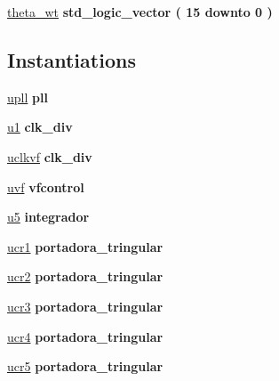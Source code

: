 \begin{DoxyCompactItemize}
\item 
\hyperlink{class_d_e0___n_a_n_o___v_f_1_1_m_a_i_n_a799a7bc2994ce9027cae6d5626148dc1}{theta\+\_\+wt} {\bfseries \textcolor{comment}{std\+\_\+logic\+\_\+vector}\textcolor{vhdlchar}{ }\textcolor{vhdlchar}{(}\textcolor{vhdlchar}{ }\textcolor{vhdlchar}{ } \textcolor{vhdldigit}{15} \textcolor{vhdlchar}{ }\textcolor{keywordflow}{downto}\textcolor{vhdlchar}{ }\textcolor{vhdlchar}{ } \textcolor{vhdldigit}{0} \textcolor{vhdlchar}{ }\textcolor{vhdlchar}{)}\textcolor{vhdlchar}{ }} 
\end{DoxyCompactItemize}
\subsection*{Instantiations}
 \begin{DoxyCompactItemize}
\item 
\hyperlink{class_d_e0___n_a_n_o___v_f_1_1_m_a_i_n_a2512a47a9296510af74d6b00755ca2bc}{upll}  {\bfseries pll}   
\item 
\hyperlink{class_d_e0___n_a_n_o___v_f_1_1_m_a_i_n_a8026a39c502750413402a90d9d8bae3c}{u1}  {\bfseries clk\+\_\+div}   
\item 
\hyperlink{class_d_e0___n_a_n_o___v_f_1_1_m_a_i_n_a27eb557254744669a6a00b4944ff5275}{uclkvf}  {\bfseries clk\+\_\+div}   
\item 
\hyperlink{class_d_e0___n_a_n_o___v_f_1_1_m_a_i_n_a05342d075a5ca740d21e6ef1a5509684}{uvf}  {\bfseries vfcontrol}   
\item 
\hyperlink{class_d_e0___n_a_n_o___v_f_1_1_m_a_i_n_a07a832ae72c9e818c5297f366284fb8a}{u5}  {\bfseries integrador}   
\item 
\hyperlink{class_d_e0___n_a_n_o___v_f_1_1_m_a_i_n_ad5456d30cc499f8bb079aef16f37264b}{ucr1}  {\bfseries portadora\+\_\+tringular}   
\item 
\hyperlink{class_d_e0___n_a_n_o___v_f_1_1_m_a_i_n_a94c848f0448710d7822f0c63ac8b434d}{ucr2}  {\bfseries portadora\+\_\+tringular}   
\item 
\hyperlink{class_d_e0___n_a_n_o___v_f_1_1_m_a_i_n_a2117c336b00064038c434778e2a439d6}{ucr3}  {\bfseries portadora\+\_\+tringular}   
\item 
\hyperlink{class_d_e0___n_a_n_o___v_f_1_1_m_a_i_n_a4be6f9699229b58bf309310fa7793933}{ucr4}  {\bfseries portadora\+\_\+tringular}   
\item 
\hyperlink{class_d_e0___n_a_n_o___v_f_1_1_m_a_i_n_ad5a334a61ae0fc53d7c612230ce25772}{ucr5}  {\bfseries portadora\+\_\+tringular}   
\item 

\end{DoxyCompactItemize}
